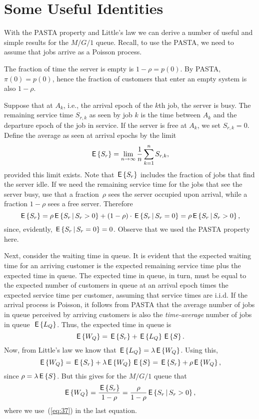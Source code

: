 \section{Some Useful Identities}
\label{sec:some-usef-ident}

With the PASTA property and Little's law we can derive a number of
useful and simple results for the $M/G/1$ queue. Recall, to use the
PASTA, we need to assume that jobs arrive as a Poisson process.

The fraction of time the server is empty is $1-\rho = p(0)$. By PASTA,
$\pi(0)=p(0)$, hence the fraction of customers that enter an empty
system is also $1-\rho$. 

Suppose that at $A_k$, i.e., the arrival epoch of the $k$th job, the
server is busy.  The remaining service time $S_{r,k}$ as seen by job
$k$ is the time between $A_k$ and the departure epoch of the job in
service. If the server is free at $A_k$, we set $S_{r,k}=0$.  Define
the average  as seen at arrival epochs by
the limit
\begin{equation*}
  \,\mathsf{E}\left\{S_r\right\} = \lim_{n\to\infty} \frac1n \sum_{k=1}^n S_{r,k},
\end{equation*}
provided this limit exists. Note that $\,\mathsf{E}\left\{S_r\right\}$ includes the fraction
of jobs that find the server idle. If we need the remaining service
time for the jobs that see the server busy, use that a fraction~$\rho$
sees the server occupied upon arrival, while a fraction $1-\rho$ sees
a free server. Therefore
\begin{equation}\label{eq:37}
\,\mathsf{E}\left\{S_r\right\} =   \rho \,\mathsf{E}\left\{S_r\,\middle|\, S_r >0\right\} + (1-\rho)\cdot \,\mathsf{E}\left\{S_r\,\middle|\, S_r = 0\right\} = \rho \,\mathsf{E}\left\{S_r\,\middle|\, S_r>0\right\},
\end{equation}
since, evidently, $\,\mathsf{E}\left\{S_r\,\middle|\, S_r=0\right\}=0$.  Observe that we used the
PASTA property here.

Next, consider the waiting time in queue.  It is evident that the
expected waiting time for an arriving customer is the expected
remaining service time plus the expected time in queue. The expected
time in queue, in turn, must be equal to the expected number of
customers in queue at an arrival epoch times the expected service time
per customer, assuming that service times are i.i.d. If the arrival
process is Poisson, it follows from PASTA that the average number of
jobs in queue perceived by arriving customers is also the
\emph{time-average} number of jobs in queue~$\,\mathsf{E}\left\{L_Q\right\}$.  Thus, the
expected time in queue is
\begin{equation}\label{eq:24}
  \,\mathsf{E}\left\{W_Q\right\} = \,\mathsf{E}\left\{S_r\right\} + \,\mathsf{E}\left\{L_Q\right\} \,\mathsf{E}\left\{S\right\}.
\end{equation}
Now, from Little's law we know that $\,\mathsf{E}\left\{L_Q\right\} = \lambda \,\mathsf{E}\left\{W_Q\right\}$. Using this,
\begin{equation*}
  \,\mathsf{E}\left\{W_Q\right\} = \,\mathsf{E}\left\{S_r\right\} + \lambda \,\mathsf{E}\left\{W_Q\right\} \,\mathsf{E}\left\{S\right\}  =\,\mathsf{E}\left\{S_r\right\} + \rho \,\mathsf{E}\left\{W_Q\right\},
\end{equation*}
since $\rho=\lambda \,\mathsf{E}\left\{S\right\}$. But this gives for the $M/G/1$ queue that
\begin{equation}\label{eq:35}
  \,\mathsf{E}\left\{W_Q\right\} = \frac{\,\mathsf{E}\left\{S_r\right\}}{1-\rho} = \frac{\rho}{1-\rho} \,\mathsf{E}\left\{S_r\,\middle|\, S_r>0\right\},
\end{equation}
where we use~(\ref{eq:37}) in the last equation.


